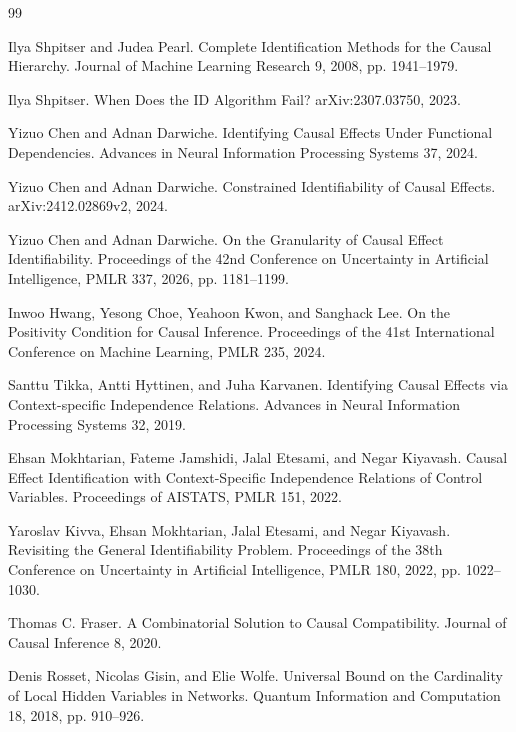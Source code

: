 \documentclass{article}
\begin{document}
\begin{thebibliography}{99}

   Ilya Shpitser and Judea Pearl. Complete Identification Methods for the Causal Hierarchy. Journal of Machine Learning Research 9, 2008, pp. 1941--1979.

   Ilya Shpitser. When Does the ID Algorithm Fail? arXiv:2307.03750, 2023.

   Yizuo Chen and Adnan Darwiche. Identifying Causal Effects Under Functional Dependencies. Advances in Neural Information Processing Systems 37, 2024.

   Yizuo Chen and Adnan Darwiche. Constrained Identifiability of Causal Effects. arXiv:2412.02869v2, 2024.

   Yizuo Chen and Adnan Darwiche. On the Granularity of Causal Effect Identifiability. Proceedings of the 42nd Conference on Uncertainty in Artificial Intelligence, PMLR 337, 2026, pp. 1181--1199.

   Inwoo Hwang, Yesong Choe, Yeahoon Kwon, and Sanghack Lee. On the Positivity Condition for Causal Inference. Proceedings of the 41st International Conference on Machine Learning, PMLR 235, 2024.

   Santtu Tikka, Antti Hyttinen, and Juha Karvanen. Identifying Causal Effects via Context-specific Independence Relations. Advances in Neural Information Processing Systems 32, 2019.

   Ehsan Mokhtarian, Fateme Jamshidi, Jalal Etesami, and Negar Kiyavash. Causal Effect Identification with Context-Specific Independence Relations of Control Variables. Proceedings of AISTATS, PMLR 151, 2022.

   Yaroslav Kivva, Ehsan Mokhtarian, Jalal Etesami, and Negar Kiyavash. Revisiting the General Identifiability Problem. Proceedings of the 38th Conference on Uncertainty in Artificial Intelligence, PMLR 180, 2022, pp. 1022--1030.

   Thomas C. Fraser. A Combinatorial Solution to Causal Compatibility. Journal of Causal Inference 8, 2020.

   Denis Rosset, Nicolas Gisin, and Elie Wolfe. Universal Bound on the Cardinality of Local Hidden Variables in Networks. Quantum Information and Computation 18, 2018, pp. 910--926.


\end{thebibliography}
\end{document}
